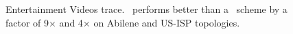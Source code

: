 {\begin{figure}[t]
\begin{center}
\end{center}
\vspace{-0.2in}
\caption{Entertainment Videos trace. \invlru\ performs better than a \optrp\  scheme by a factor of 9$\times$ and 4$\times$ on Abilene and US-ISP topologies.  }
\label{fig:entertainmentMLU}
\end{figure}

}

